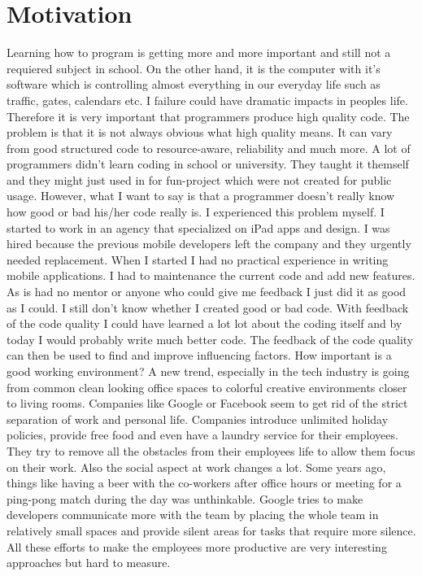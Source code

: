 \section{Motivation}
Learning how to program is getting more and more important and still not a requiered subject in school. On the other hand, it is the computer with it's software which is controlling almost everything in our everyday life such as traffic, gates, calendars etc. I failure could have dramatic impacts in peoples life. 
Therefore it is very important that programmers produce high quality code. The problem is that it is not always obvious what high quality means. It can vary from good structured code to resource-aware, reliability and much more. A lot of programmers didn't learn coding in school or university. They taught it themself and they might just used in for fun-project which were not created for public usage. However, what I want to say is that a programmer doesn't really know how good or bad his/her code really is. 
I experienced this problem myself. 
I started to work in an agency that specialized on iPad apps and design. I was hired because the previous mobile developers left the company and they urgently needed replacement. When I started I had no practical experience in writing mobile applications. I had to maintenance the current code and add new features. As is had no mentor or anyone who could give me feedback I just did it as good as I could. I still don't know whether I created good or bad code. With feedback of the code quality I could have learned a lot lot about the coding itself and by today I would probably write much better code. 
The feedback of the code quality can then be used to find and improve influencing factors. 
How important is a good working environment?
A new trend, especially in the tech industry is going from common clean looking office spaces to colorful creative environments closer to living rooms. Companies like Google or Facebook seem to get rid of the strict separation of work and personal life. Companies introduce unlimited holiday policies, provide free food and even have a laundry service for their employees. They try to remove all the obstacles from their employees life to allow them focus on their work. 
Also the social aspect at work changes a lot. Some years ago, things like having a beer with the co-workers after office hours or meeting for a ping-pong match during the day was unthinkable. 
Google tries to make developers communicate more with the team by placing the whole team in relatively small spaces and provide silent areas for tasks that require more silence. 
All these efforts to make the employees more productive are very interesting approaches but hard to measure. 

